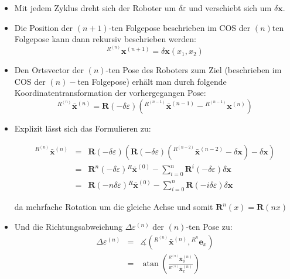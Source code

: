\documentclass[10pt,a4paper]{article}
\DeclareMathOperator{\atan}{atan}
\begin{document}
\begin{itemize}
	\item Mit jedem Zyklus dreht sich der Roboter um $\delta \varepsilon$ und verschiebt sich um $\delta \bm{x}$.

	\item Die Position der $(n+1)$-ten Folgepose beschrieben im COS der $(n)$ten Folgepose kann dann rekursiv beschrieben werden:
	\begin{equation}
	{^{R^{(n)}}}\bm{x}^{(n+1)} = \delta \bm{x}(x_1,x_2)
	\end{equation}
	
	\item Den Ortsvector der $(n)$-ten Pose des Roboters zum Ziel (beschrieben im COS der $(n)-$ten Folgepose) erhält man durch folgende Koordinatentransformation der vorhergegangen Pose:
	\begin{equation}
	{^{R^{(n)}}}\bar{\bm{x}}^{(n)} = \bm{R}(-\delta\varepsilon)\left({^{R^{(n-1)}}}\bar{\bm{x}}^{(n-1)}-{^{R^{(n-1)}}}\bm{x}^{(n)}\right)
	\end{equation}
	\item Explizit lässt sich das Formulieren zu:

	\begin{eqnarray}
	{^{R^{(n)}}}\bar{\bm{x}}^{(n)} &=& 
	\bm{R}(-\delta\varepsilon)\left(
	\bm{R}(-\delta\varepsilon) \left( {^{R^{(n-2)}}}\bar{\bm{x}}^{(n-2)} - \delta\bm{x}\right)
	-\delta\bm{x}\right) \\
	&=& 
	\bm{R}^n(-\delta\varepsilon){^R}\bar{\bm{x}}^{(0)} - \sum_{i=0}^n \bm{R}^i(-\delta\varepsilon) \delta \bm{x} \\
	&=& 
	\bm{R}(-n \delta\varepsilon){^R}\bar{\bm{x}}^{(0)} - \sum_{i=0}^n \bm{R}(- i \delta\varepsilon) \delta \bm{x}
	\end{eqnarray}
	
	da mehrfache Rotation um die gleiche Achse und somit $\bm{R}^n(x) = \bm{R}(nx)$


	\item Und die Richtungsabweichung $\Delta \varepsilon^{(n)}$ der $(n)$-ten Pose zu:
	\begin{eqnarray}
	\Delta \varepsilon^{(n)} 
	&=& \measuredangle \left( {^{R^{(n)}}}\bar{\bm{x}}^{(n)} , {^{R^{n}}}\bm{e}_x \right) \\
	&=& \atan \left(
	\frac{	{^{R^{(n)}}}\bar{\bm{x}}^{(n)}_y }{
	{^{R^{(n)}}}\bar{\bm{x}}^{(n)}_x}
	\right)
	\end{eqnarray}	
	

\end{itemize}
\end{document}

